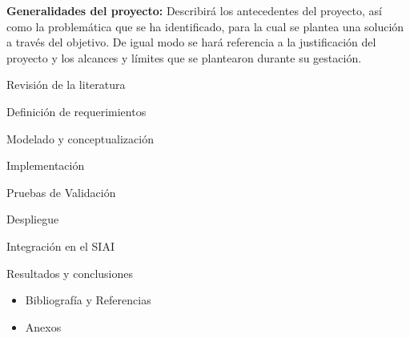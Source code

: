 \begin{syllabus}
    \item \textbf{Generalidades del proyecto:} Describirá los antecedentes del proyecto, así como la problemática que se ha identificado, para la cual se plantea una solución a través del objetivo. De igual modo se hará referencia a la justificación del proyecto y los alcances y límites que se plantearon durante su gestación.
    \item Revisión de la literatura
    \item Definición de requerimientos
    \item Modelado y conceptualización
    \item Implementación
    \item Pruebas de Validación
    \item Despliegue
    \item Integración en el SIAI
    \item Resultados y conclusiones
\end{syllabus}

\begin{itemize}
    \item Bibliografía y Referencias
    \item Anexos
\end{itemize}